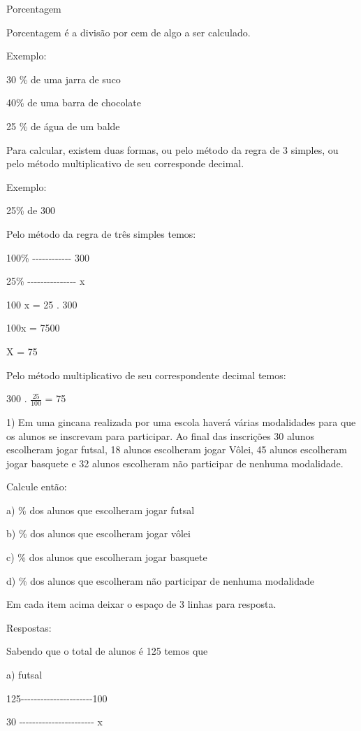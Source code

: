 {Porcentagem

Porcentagem é a divisão por cem de algo a ser calculado.

Exemplo:

30 \% de uma jarra de suco

40\% de uma barra de chocolate

25 \% de água de um balde

Para calcular, existem duas formas, ou pelo método da regra de 3
simples, ou pelo método multiplicativo de seu corresponde decimal.

Exemplo:

25\% de 300

Pelo método da regra de três simples temos:

100\% -\/-\/-\/-\/-\/-\/-\/-\/-\/-\/-\/- 300

25\% -\/-\/-\/-\/-\/-\/-\/-\/-\/-\/-\/-\/-\/-\/- x

100 x = 25 . 300

100x = 7500

X = 75

Pelo método multiplicativo de seu correspondente decimal temos:

300 . \(\frac{25}{100}\) = 75


1) Em uma gincana realizada por uma escola haverá várias modalidades
para que os alunos se inscrevam para participar. Ao final das inscrições
30 alunos escolheram jogar futsal, 18 alunos escolheram jogar Vôlei, 45
alunos escolheram jogar basquete e 32 alunos escolheram não participar
de nenhuma modalidade.

Calcule então:

a) \% dos alunos que escolheram jogar futsal

b) \% dos alunos que escolheram jogar vôlei

c) \% dos alunos que escolheram jogar basquete

d) \% dos alunos que escolheram não participar de nenhuma modalidade

Em cada item acima deixar o espaço de 3 linhas para resposta.

Respostas:

Sabendo que o total de alunos é 125 temos que

a) futsal

125-\/-\/-\/-\/-\/-\/-\/-\/-\/-\/-\/-\/-\/-\/-\/-\/-\/-\/-\/-\/-\/-100

30 -\/-\/-\/-\/-\/-\/-\/-\/-\/-\/-\/-\/-\/-\/-\/-\/-\/-\/-\/-\/-\/-\/- x

}
